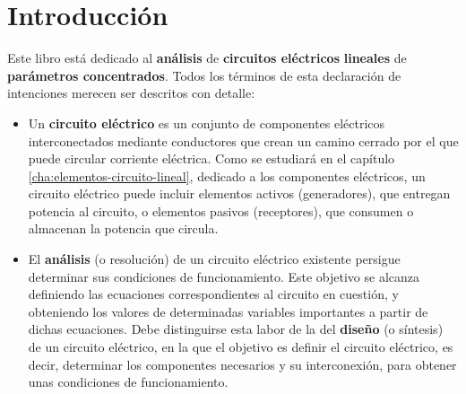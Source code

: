 \chapter{Introducción}
\label{cha:intro}
Este libro está dedicado al \textbf{análisis} de \textbf{circuitos eléctricos} \textbf{lineales} de \textbf{parámetros concentrados}. Todos los términos de esta declaración de intenciones merecen ser descritos con detalle:

\begin{itemize}
  
\item Un \textbf{circuito eléctrico} es un conjunto de componentes eléctricos interconectados mediante conductores que crean un camino cerrado por el que puede circular corriente eléctrica. Como se estudiará en el capítulo \ref{cha:elementos-circuito-lineal}, dedicado a los componentes eléctricos, un circuito eléctrico puede incluir elementos activos (generadores), que entregan potencia al circuito, o elementos pasivos (receptores), que consumen o almacenan la potencia que circula.
  
\item El \textbf{análisis} (o resolución) de un circuito eléctrico existente persigue determinar sus condiciones de funcionamiento. Este objetivo se alcanza definiendo las ecuaciones correspondientes al circuito en cuestión, y obteniendo los valores de determinadas variables importantes a partir de dichas ecuaciones. Debe distinguirse esta labor de la del \textbf{diseño} (o síntesis) de un circuito eléctrico, en la que el objetivo es definir el circuito eléctrico, es decir, determinar los componentes necesarios y su interconexión, para obtener unas condiciones de funcionamiento. 


\end{itemize}
